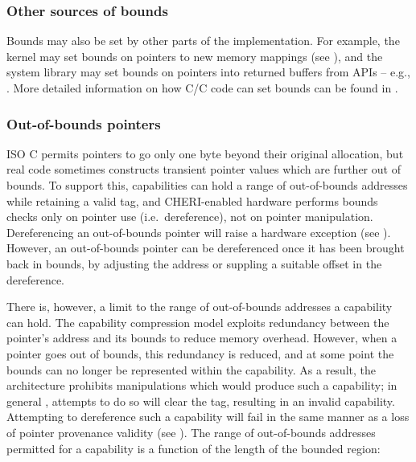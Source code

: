 \documentclass[12pt,twoside,openright,a4paper]{article}
\newcommand{\ccode}[1]{{\small\ttfamily{#1}}}
\newcommand{\cfunc}[1]{{\ccode{#1()}}}
\newcommand{\note}[2]{{\color{blue}[ Note: #1 - #2]}}
\renewcommand{\note}[2]{\relax\ifhmode\unskip\fi}
\newcommand{\arnote}[1]{\note{#1}{Alex R.}}
\newcommand{\psnote}[1]{\note{#1}{Peter S.}}
\newcommand*{\cpp}[1][]{C\textsmaller[2]{\nolinebreak[4]\hspace{-.05em}\raisebox{.45ex}{\textbf{++}}}}
\begin{document}
\psnote{that seems excessively bold to me}
\psnote{what flag?}
\psnote{curious: what has to change before you think it'd be a good default?}


\subsubsection{Other sources of bounds}

Bounds may also be set by other parts of the implementation.
For example, the kernel may set bounds on pointers to new memory mappings (see
), and the system library may set bounds on pointers
into returned buffers from APIs -- e.g., \cfunc{fgetln}.
More detailed information on how C/\cpp{} code can set bounds can be found in
.

\subsubsection{Out-of-bounds pointers}
\label{sec:oob}

\note{I feel like this section wants a reference to CHERI Concentrate?}{nwf}

ISO C permits pointers to go only one byte beyond their original
allocation, but real code sometimes constructs transient pointer
values which are further out of bounds.  To support this, capabilities
can hold a range of out-of-bounds addresses while retaining a valid
tag, and CHERI-enabled hardware performs bounds checks only on pointer
use (i.e.\ dereference), not on pointer manipulation.  Dereferencing
an out-of-bounds pointer will raise a hardware exception (see
).  However, an out-of-bounds pointer can be
dereferenced once it has been brought back in bounds, by adjusting the
address or suppling a suitable offset in the dereference.

There is, however, a limit to the range of out-of-bounds addresses a capability can hold.
The capability compression model exploits redundancy between the pointer's address and
its bounds to reduce memory overhead.
However, when a pointer goes out of bounds, this redundancy is reduced, and at
some point the bounds can no longer be represented within the capability.
As a result, the architecture prohibits manipulations which would produce such
a capability; in general%
\psnote{slightly mysterious ``in general'' -- isn't this always true?}%
\arnote{I think the intent of this wording was to allow for trapping behaviour?}%
, attempts to do so will clear the tag, resulting in
an invalid capability.
Attempting to dereference such a capability will fail in the same
manner as a loss of pointer provenance validity (see
).
\psnote{Comment on whether that should immediately trap instead?}
The range of out-of-bounds addresses permitted for a capability is
a function of the length of the bounded region:
\end{document}
